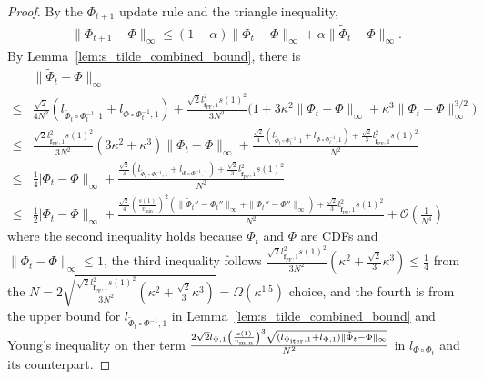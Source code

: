 \documentclass{article}
\newcommand{\Oc}{\mathcal{O}}
\newcommand{\f}{\mathbf{f}}
\newcommand{\Farc}{\Phi}
\begin{document}
\begin{proof}%
By the $\Farc_{t+1}$ update rule and the triangle inequality,
\begin{align}
\|\Farc_{t+1}-\Farc\|_\infty
\le
(1-\alpha)\|\Farc_t-\Farc\|_\infty
+
\alpha\|\tilde\Farc_t-\Farc\|_\infty .
\label{eq:outer_pre_basin}
\end{align}
By Lemma~\ref{lem:s_tilde_combined_bound}, there is
\begin{align} 
 & \|\tilde \Farc_t-\Farc\|_\infty \nonumber \\
 \le & \frac{\sqrt2}{4N^2}\left(l_{\tilde\Farc_t\circ\Farc_t^{-1},1}+l_{\Farc\circ\Farc_t^{-1},1}\right) + \frac{\sqrt2 l_{\tilde{\f}_{\mathrm{PF}},1}^2 s(1)^2}{3 N^2}\bigg( 1 + 3 \kappa^2 \|\Farc_t-\Farc\|_\infty + \kappa^3 \|\Farc_t-\Farc\|_\infty^{3/2} \bigg) \nonumber \\
 \le& \frac{\sqrt2 l_{\tilde{\f}_{\mathrm{PF}},1}^2 s(1)^2}{3N^2} \left(3\kappa^2+\kappa^3\right)\|\Farc_t-\Farc\|_\infty 
 +\frac{\frac{\sqrt{2}}{4} \left(l_{\tilde\Farc_t\circ\Farc_t^{-1},1}+l_{\Farc\circ\Farc_t^{-1},1}\right)+ \frac{\sqrt{2}}{3}l_{\tilde{\f}_{\mathrm{PF}},1}^2 s(1)^2}{N^2} \nonumber\\
 \leq & \frac{1}{4}|\Farc_t-\Farc\|_\infty 
 +\frac{\frac{\sqrt{2}}{4}\left(l_{\tilde\Farc_t\circ\Farc_t^{-1},1}+l_{\Farc\circ\Farc_t^{-1},1}\right) + \frac{\sqrt{2}}{3}l_{\tilde{\f}_{\mathrm{PF}},1}^2 s(1)^2}{N^2} \nonumber\\
 \leq & \frac{1}{2}|\Farc_t-\Farc\|_\infty 
 + \frac{\frac{\sqrt{2}}{4}\left(\frac{s(1)}{v_{\min}}\right)^2 \left(\|\tilde\Farc_t''-\Farc_t''\|_\infty+\|\Farc_t''-\Farc''\|_\infty\right) +\frac{\sqrt{2}}{3} l_{\tilde{\f}_{\mathrm{PF}},1}^2 s(1)^2}{N^2} + \Oc\left(\frac{1}{N^4}\right) \nonumber
\end{align}
where the second inequality holds because $\Farc_t$ and $\Farc$ are CDFs and $\|\Farc_t-\Farc\|_\infty\le1$, the third inequality follows $\frac{\sqrt2 l_{\tilde{\f}_{\mathrm{PF}},1}^2 s(1)^2}{3 N^2} \left( \kappa^2+\frac{\sqrt2}{3}\kappa^3 \right) \le \frac14$ from the $N = 2\sqrt{\frac{\sqrt2 l_{\tilde{\f}_{\mathrm{PF}},1}^2 s(1)^2}{3 N^2} \left( \kappa^2+\frac{\sqrt2}{3}\kappa^3 \right)} =  \Omega(\kappa^{1.5})$ choice, and the fourth is from the upper bound for $l_{\tilde\Farc_t\circ\Farc^{-1},1}$ in Lemma~\ref{lem:s_tilde_combined_bound} and Young's inequality on ther term $\frac{2\sqrt2 l_{\Farc,1} \left(\frac{s(1)}{v_{\min}}\right)^3 \sqrt{ (l_{\Farc_{\rm iter},1}+l_{\Farc,1}) \|\tilde\Farc_t-\Farc\|_\infty}}{N^2}$ in $l_{\Farc\circ \Farc_t}$ and its counterpart.

\end{proof}
\end{document}

